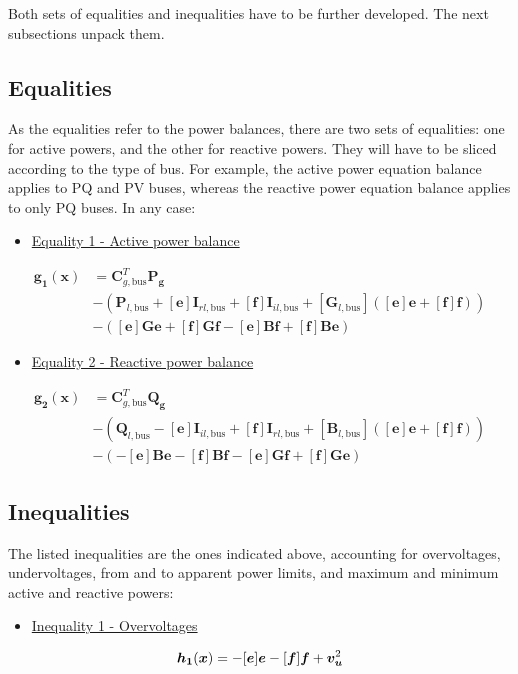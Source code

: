 \documentclass{article}
\begin{document}
Both sets of equalities and inequalities have to be further developed. The next subsections unpack them.

\subsection{Equalities}
As the equalities refer to the power balances, there are two sets of equalities: one for active powers, and the other for reactive powers. They will have to be sliced according to the type of bus. For example, the active power equation balance applies to PQ and PV buses, whereas the reactive power equation balance applies to only PQ buses. In any case:

\begin{itemize}
    \item \underline{Equality 1 - Active power balance}
\end{itemize}
\begin{equation}
    \begin{split}
    \bm{g_1}(\bm{x}) &= \bm{C}_{g,\text{bus}}^T \bm{P_g} \\ 
                     &- (\bm{P}_{l,\text{bus}} + [\bm{e}]\bm{I}_{rl,\text{bus}} + [\bm{f}]\bm{I}_{il,\text{bus}} + [\bm{G}_{l,\text{bus}}]([\bm{e}]\bm{e} + [\bm{f}]\bm{f})) \\
                     &- ([\bm{e}]\bm{G}\bm{e} + [\bm{f}]\bm{G}\bm{f} - [\bm{e}]\bm{B}\bm{f} + [\bm{f}]\bm{B}\bm{e})
    \end{split}
\end{equation}

\begin{itemize}
    \item \underline{Equality 2 - Reactive power balance}
\end{itemize}
\begin{equation}
    \begin{split}
    \bm{g_2}(\bm{x}) &= \bm{C}_{g,\text{bus}}^T \bm{Q_g} \\
                     &- (\bm{Q}_{l,\text{bus}} -[\bm{e}]\bm{I}_{il,\text{bus}} + [\bm{f}]\bm{I}_{rl,\text{bus}} + [\bm{B}_{l,\text{bus}}]([\bm{e}]\bm{e} + [\bm{f}]\bm{f})) \\
                     &- (-[\bm{e}]\bm{B}\bm{e} - [\bm{f}]\bm{B}\bm{f} - [\bm{e}]\bm{G}\bm{f} + [\bm{f}]\bm{G}\bm{e})
    \end{split}
\end{equation}

\subsection{Inequalities}
The listed inequalities are the ones indicated above, accounting for overvoltages, undervoltages, from and to apparent power limits, and maximum and minimum active and reactive powers:
\begin{itemize}
    \item \underline{Inequality 1 - Overvoltages}
\end{itemize}
\begin{equation}
    \bm{h_1}(\bm{x}) = - [\bm{e}]\bm{e} - [\bm{f}]\bm{f} + \bm{v_u}^2 \\
\end{equation}
\end{document}
